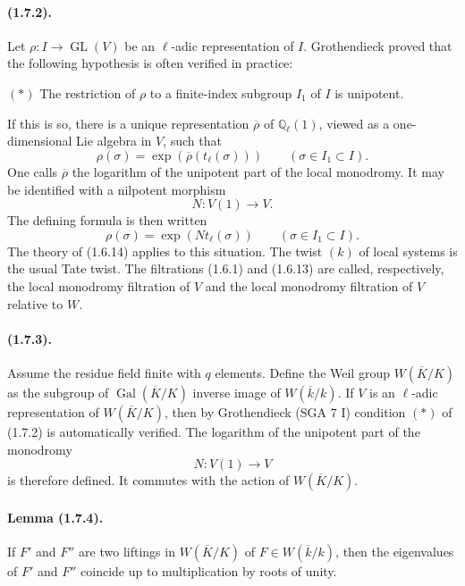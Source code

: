 \documentclass[11pt]{article}
\theoremstyle{remark}
\newcommand{\Ql}{\mathbb{Q}_\ell}
\newcommand{\GL}{\operatorname{GL}}
\newcommand{\Gal}{\operatorname{Gal}}
\begin{document}
\paragraph{(1.7.2).}
Let $\rho:I\to\GL(V)$ be an $\ell$-adic representation of $I$. Grothendieck proved that the following hypothesis is often verified in practice:

\smallskip
\noindent $(*)$ The restriction of $\rho$ to a finite-index subgroup $I_1$ of $I$ is unipotent.
\smallskip

If this is so, there is a unique representation $\overline\rho$ of $\Ql(1)$, viewed as a one-dimensional Lie algebra in $V$, such that
\begin{equation}\tag{1.7.2.1}
\rho(\sigma)=\exp(\overline\rho(t_\ell(\sigma)))\qquad(\sigma\in I_1\subset I).
\end{equation}
One calls $\overline\rho$ the logarithm of the unipotent part of the local monodromy. It may be identified with a nilpotent morphism
\[
N:V(1)\longrightarrow V.
\]
The defining formula is then written
\begin{equation}\tag{1.7.2.2}
\rho(\sigma)=\exp(Nt_\ell(\sigma))\qquad(\sigma\in I_1\subset I).
\end{equation}
The theory of (1.6.14) applies to this situation. The twist $(k)$ of local systems is the usual Tate twist. The filtrations (1.6.1) and (1.6.13) are called, respectively, the local monodromy filtration of $V$ and the local monodromy filtration of $V$ relative to $W$.

\paragraph{(1.7.3).}
Assume the residue field finite with $q$ elements. Define the Weil group $W(\overline K/K)$ as the subgroup of $\Gal(\overline K/K)$ inverse image of $W(\overline k/k)$. If $V$ is an $\ell$-adic representation of $W(\overline K/K)$, then by Grothendieck (SGA 7 I) condition $(*)$ of (1.7.2) is automatically verified. The logarithm of the unipotent part of the monodromy
\[
N:V(1)\longrightarrow V
\]
is therefore defined. It commutes with the action of $W(\overline K/K)$.

\paragraph{Lemma (1.7.4).}
If $F'$ and $F''$ are two liftings in $W(\overline K/K)$ of $F\in W(\overline k/k)$, then the eigenvalues of $F'$ and $F''$ coincide up to multiplication by roots of unity.
\end{document}

